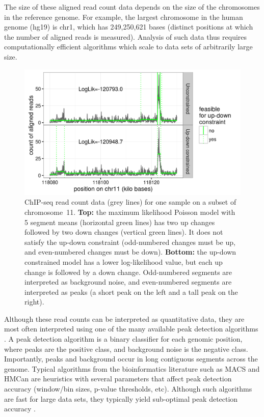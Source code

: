 \documentclass[aoas]{imsart}
\begin{document}
The size of these aligned read count data depends on the size of the
chromosomes in the reference genome. For example, the largest
chromosome in the human genome (hg19) is chr1, which has 249,250,621
bases (distinct positions at which the number of aligned reads is
measured). Analysis of such data thus requires computationally
efficient algorithms which scale to data sets of arbitrarily large
size.

\begin{figure}[t!]
  \centering
  \includegraphics[width=\textwidth]{figure-data-models}
  \vskip -0.5cm
  \caption{ChIP-seq read count data (grey lines) for one sample on a
    subset of chromosome~11. \textbf{Top:} the maximum likelihood
    Poisson model with 5 segment means (horizontal green lines) has
    two up changes followed by two down changes (vertical green
    lines). It does not satisfy the up-down constraint (odd-numbered
    changes must be up, and even-numbered changes must be
    down). \textbf{Bottom:} the up-down constrained model has a lower
    log-likelihood value, but each up change is followed by a down
    change. Odd-numbered segments are interpreted as background noise,
    and even-numbered segments are interpreted as peaks (a short peak
    on the left and a tall peak on the right).}
  \label{fig:data-models}
\end{figure}

Although these read counts can be interpreted as quantitative data,
they are most often interpreted using one of the many available peak
detection algorithms \citep{evaluation2010, rye2010manually,
  chip-seq-bench}. A peak detection algorithm is a binary classifier
for each genomic position, where peaks are the positive class, and
background noise is the negative class. Importantly, peaks and
background occur in long contiguous segments across the
genome. Typical algorithms from the bioinformatics literature such as
MACS \citep{MACS} and HMCan \citep{HMCan} are heuristics with several
parameters that affect peak detection accuracy (window/bin sizes,
p-value thresholds, etc). Although such algorithms are fast for large
data sets, they typically yield sub-optimal peak detection accuracy
\citep{HOCKING2016-chipseq}.
\end{document}
